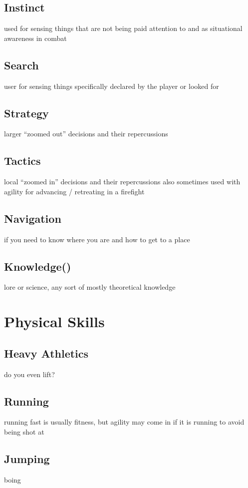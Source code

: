 \subsection{Instinct}\label{subsec:instinct}
used for sensing things that are not being paid attention to and as situational awareness in combat
\subsection{Search}\label{subsec:search}
user for sensing things specifically declared by the player or looked for
\subsection{Strategy}\label{subsec:strategy}
larger ``zoomed out'' decisions and their repercussions
\subsection{Tactics}\label{subsec:tactics}
local ``zoomed in'' decisions and their repercussions
also sometimes used with agility for advancing / retreating in a firefight
\subsection{Navigation}\label{subsec:navigation}
if you need to know where you are and how to get to a place
\subsection{Knowledge()}\label{subsec:knowledge}
lore or science, any sort of mostly theoretical knowledge


\section{Physical Skills}\label{sec:strength-skills}
\subsection{Heavy Athletics}\label{subsec:heavy-athletics}
do you even lift?
\subsection{Running}\label{subsec:running}
running fast is usually fitness, but agility may come in if it is running to avoid being shot at
\subsection{Jumping}\label{subsec:jumping}
boing
